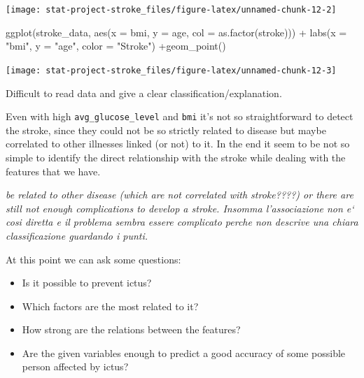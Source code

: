 \documentclass[
]{article}
\newenvironment{Shaded}{\begin{snugshade}}{\end{snugshade}}
\newcommand{\AttributeTok}[1]{\textcolor[rgb]{0.77,0.63,0.00}{#1}}
\newcommand{\FunctionTok}[1]{\textcolor[rgb]{0.00,0.00,0.00}{#1}}
\newcommand{\NormalTok}[1]{#1}
\newcommand{\SpecialCharTok}[1]{\textcolor[rgb]{0.00,0.00,0.00}{#1}}
\newcommand{\StringTok}[1]{\textcolor[rgb]{0.31,0.60,0.02}{#1}}
\providecommand{\tightlist}{%
  \setlength{\itemsep}{0pt}\setlength{\parskip}{0pt}}
\begin{document}
\begin{center}\texttt{[image: stat-project-stroke\_files/figure-latex/unnamed-chunk-12-2]} \end{center}

\begin{Shaded}
\begin{Highlighting}[]
\FunctionTok{ggplot}\NormalTok{(stroke\_data, }\FunctionTok{aes}\NormalTok{(}\AttributeTok{x =}\NormalTok{ bmi, }\AttributeTok{y =}\NormalTok{ age, }\AttributeTok{col =} \FunctionTok{as.factor}\NormalTok{(stroke))) }\SpecialCharTok{+}
  \FunctionTok{labs}\NormalTok{(}\AttributeTok{x =} \StringTok{"bmi"}\NormalTok{, }\AttributeTok{y =} \StringTok{"age"}\NormalTok{, }\AttributeTok{color =} \StringTok{"Stroke"}\NormalTok{) }\SpecialCharTok{+}\FunctionTok{geom\_point}\NormalTok{()}
\end{Highlighting}
\end{Shaded}

\begin{center}\texttt{[image: stat-project-stroke\_files/figure-latex/unnamed-chunk-12-3]} \end{center}

Difficult to read data and give a clear classification/explanation.

Even with high \texttt{avg\_glucose\_level} and \texttt{bmi} it's not so
straightforward to detect the stroke, since they could not be so
strictly related to disease but maybe correlated to other illnesses
linked (or not) to it. In the end it seem to be not so simple to
identify the direct relationship with the stroke while dealing with the
features that we have.

\emph{be related to other disease (which are not correlated with
stroke????) or there are still not enough complications to develop a
stroke. Insomma l'associazione non e` cosi diretta e il problema sembra
essere complicato perche non descrive una chiara classificazione
guardando i punti.}

At this point we can ask some questions:

\begin{itemize}
\tightlist
\item
  Is it possible to prevent ictus?
\item
  Which factors are the most related to it?
\item
  How strong are the relations between the features?
\item
  Are the given variables enough to predict a good accuracy of some
  possible person affected by ictus?
\end{itemize}
\end{document}
